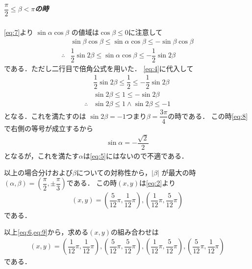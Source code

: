 \documentclass[../../main.tex]{subfiles}
\begin{document}
\subparagraph{$\dfrac{\pi}{2} \le \beta < \pi$の時}

\cref{eq:7}より $\sin\alpha \cos\beta$ の値域は$\cos\beta \le 0$に注意して
\begin{align}
  & \sin\beta\cos\beta \le \sin\alpha \cos\beta \le -\sin\beta\cos\beta \\
  \therefore
  & \dfrac{1}{2}\sin 2\beta \le \sin\alpha \cos\beta \le -\dfrac{1}{2}\sin 2\beta
\end{align}
である．ただし二行目で倍角公式を用いた．
\cref{eq:4}に代入して
\begin{align}
  & \dfrac{1}{2}\sin 2\beta \le \dfrac{1}{2} \le -\dfrac{1}{2}\sin 2\beta \\
  & \sin 2\beta \le 1 \le -\sin 2\beta \\
  \therefore
  & \sin 2\beta \le 1 \land \sin 2\beta \le -1 \label{eq:8}
\end{align}
となる．これを満たすのは $\sin 2\beta = -1$つまり$\beta=\dfrac{3\pi}{4}$の時である．
この時\cref{eq:8}で右側の等号が成立するから
\begin{align}
  \sin\alpha = -\dfrac{\sqrt{2}}{2}
\end{align}
となるが，これを満たす$\alpha$は\cref{eq:5}にはないので不適である．
\casesend

以上の場合分けおよび$\beta$についての対称性から，$|\beta|$ が最大の時 $(\alpha, \beta) = (\dfrac{\pi}{2}, \pm \dfrac{\pi}{3})$である．
この時$(x,y)$は\cref{eq:2}より
\begin{align}
  (x, y) = \left(\dfrac{5}{12}\pi, \dfrac{1}{12}\pi\right), \left(\dfrac{1}{12}\pi, \dfrac{5}{12}\pi\right) \label{eq:9}
\end{align}
である．

以上\cref{eq:6,eq:9}から，求める$(x,y)$の組み合わせは
\begin{align}
  (x, y) = \left(\dfrac{1}{12}\pi, \dfrac{1}{12}\pi\right), \left(\dfrac{5}{12}\pi, \dfrac{5}{12}\pi\right), \left(\dfrac{1}{12}\pi, \dfrac{5}{12}\pi\right), \left(\dfrac{5}{12}\pi, \dfrac{1}{12}\pi\right)
\end{align}
である．
\end{document}
